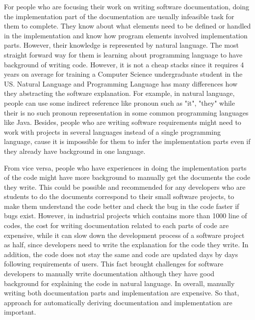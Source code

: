 For people who are focusing their work on writing software documentation, doing the implementation part of the documentation are usually infeasible task for them to complete. They know about what elements need to be defined or handled in the implementation and know how program elements involved implementation parts. However, their knowledge is represented by natural language. The most straight forward way for them is learning about programming language to have background of writing code. However, it is not a cheap stacks since it requires 4 years on average for training a Computer Science undergraduate student in the US. Natural Language and Programming Language has many differences how they abstracting the software explanation. For example, in natural language, people can use some indirect reference like pronoun such as "it", "they" while their is no such pronoun representation in some common programming languages like Java. Besides, people who are writing software requirements might need to work with projects in several languages instead of a single programming language, cause it is impossible for them to infer the implementation parts even if they already have background in one language.

From vice versa, people who have experiences in doing the implementation parts of the code might have more background to manually get the documents the code they write. This could be possible and recommended for any developers who are students to do the documents correspond to their small software projects, to make them understand the code better and check the bug in the code faster if bugs exist. However, in industrial projects which contains more than 1000 line of codes, the cost for writing documentation related to each parts of code are expensive, while it can slow down the development process of a software project as half, since developers need to write the explanation for the code they write. In addition, the code does not stay the same and code are updated days by days following requirements of users. This fact brought challenges for software developers to manually write documentation although they have good background for explaining the code in natural language. In overall, manually writing both documentation parts and implementation  are expensive. So that, approach for automatically deriving documentation and implementation are important.

